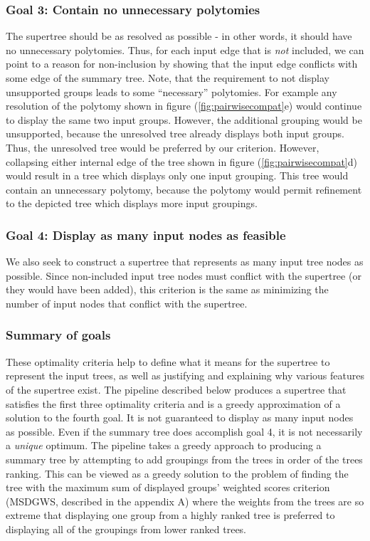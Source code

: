 \documentclass[fleqn,12pt,lineno,english]{wlpeerj}
\begin{document}
\subsubsection{Goal 3: Contain no unnecessary polytomies}

The supertree should be as resolved as possible - in other words,
it should have no unnecessary polytomies. Thus, for each input edge
that is \emph{not} included, we can point to a reason for non-inclusion
by showing that the input edge conflicts with some edge of the summary
tree. Note, that the requirement to not display unsupported groups
leads to some ``necessary'' polytomies. For example any resolution
of the polytomy shown in figure (\ref{fig:pairwisecompat}e) would
continue to display the same two input groups. However, the additional
grouping would be unsupported, because the unresolved tree already
displays both input groups. Thus, the 
unresolved tree would be preferred by our criterion.
However, collapsing either internal edge of the tree shown in figure
(\ref{fig:pairwisecompat}d) would result in a tree which displays
only one input grouping. This tree would contain an unnecessary polytomy,
because the polytomy would permit refinement to the depicted tree
which displays more input groupings.

\subsubsection{Goal 4: Display as many input nodes as feasible}

We also seek to construct a supertree that represents as many input
tree nodes as possible. Since non-included input tree nodes must conflict
with the supertree (or they would have been added), this criterion
is the same as minimizing the number of input nodes that conflict
with the supertree.

\subsubsection{Summary of goals}

These optimality criteria help to define what it means for the supertree
to represent the input trees, as well as justifying and explaining
why various features of the supertree exist. The pipeline described
below produces a supertree that satisfies the first three optimality
criteria and is a greedy approximation of a solution to the fourth
goal. It is not guaranteed to display as many input nodes as possible.
Even if the summary tree does accomplish goal 4, it is not necessarily
a \emph{unique} optimum. The pipeline takes a greedy approach to producing
a summary tree by attempting to add groupings from the trees in order
of the trees ranking. This can be viewed as a greedy solution to the
problem of finding the tree with the maximum sum of displayed groups'
weighted scores criterion (MSDGWS, described in the appendix A) where the
weights from the trees are so extreme that displaying one group from
a highly ranked tree is preferred to displaying all of the groupings
from lower ranked trees.
\end{document}
